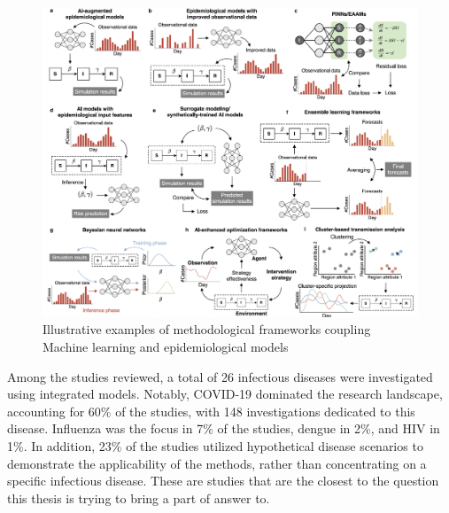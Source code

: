 \begin{figure}[h]
  \includegraphics[width=\linewidth]{figures/chap1/chap1-hybrid.png}
  \caption{Illustrative examples of methodological frameworks coupling Machine learning and epidemiological models}
  \label{fig:chap1-hybrid}
\end{figure}


Among the studies reviewed, a total of 26 infectious diseases were investigated using integrated models. Notably, COVID-19 dominated the research landscape, accounting for 60\% of the studies, with 148 investigations dedicated to this disease. Influenza was the focus in 7\% of the studies, dengue in 2\%, and HIV in 1\%. In addition, 23\% of the studies utilized hypothetical disease scenarios to demonstrate the applicability of the methods, rather than concentrating on a specific infectious disease. These are studies that are the closest to the question this thesis is trying to bring a part of answer to.



